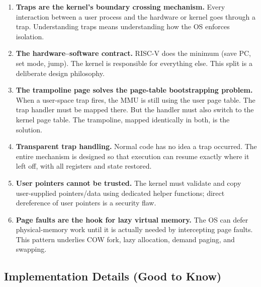 \documentclass[11pt, a4paper]{article}
\begin{document}
\begin{tcolorbox}[foundational, title={Foundational Concepts}]
\begin{enumerate}[leftmargin=1.8em, itemsep=0.3em]
  \item \textbf{Traps are the kernel's boundary crossing mechanism.}
        Every interaction between a user process and the hardware or kernel goes through a trap. Understanding traps means understanding how the OS enforces isolation.

  \item \textbf{The hardware--software contract.}
        RISC-V does the minimum (save PC, set mode, jump). The kernel is responsible for everything else. This split is a deliberate design philosophy.

  \item \textbf{The trampoline page solves the page-table bootstrapping problem.}
        When a user-space trap fires, the MMU is still using the user page table. The trap handler must be mapped there. But the handler must also switch to the kernel page table. The trampoline, mapped identically in both, is the solution.

  \item \textbf{Transparent trap handling.}
        Normal code has no idea a trap occurred. The entire mechanism is designed so that execution can resume exactly where it left off, with all registers and state restored.

  \item \textbf{User pointers cannot be trusted.}
        The kernel must validate and copy user-supplied pointers/data using dedicated helper functions; direct dereference of user pointers is a security flaw.

  \item \textbf{Page faults are the hook for lazy virtual memory.}
        The OS can defer physical-memory work until it is actually needed by intercepting page faults. This pattern underlies COW fork, lazy allocation, demand paging, and swapping.
\end{enumerate}
\end{tcolorbox}

\subsection{Implementation Details (Good to Know)}
\end{document}
